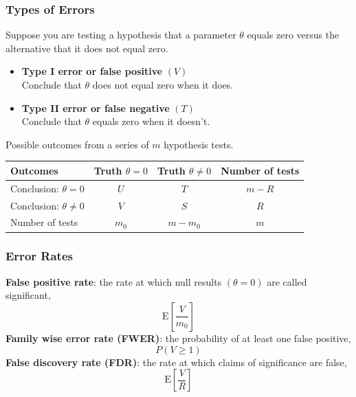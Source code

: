 \documentclass[a4paper]{article}
\begin{document}
\subsubsection{Types of Errors}
Suppose you are testing a hypothesis that a parameter \( \theta \) equals zero versus the alternative that it does not equal zero.
\begin{itemize}
	\item \textbf{Type I error or false positive} \( (V) \)\\
	Conclude that \( \theta \) does not equal zero when it does.
	\item \textbf{Type II error or false negative} \( (T) \)\\
	Conclude that \( \theta \) equals zero when it doesn't.
\end{itemize}
Possible outcomes from a series of \( m \) hypothesis tests.
\begin{table}[H]
	\centering
	\begin{tabular}{@{}lccc@{}}
	\toprule
	Outcomes                        & Truth \( \theta = 0 \) & Truth \( \theta \neq 0 \) & Number of tests \\ \midrule
	Conclusion: \( \theta = 0 \)    & \( U \)                & \( T \)                   & \( m - R \)     \\
	Conclusion: \( \theta \neq 0 \) & \( V \)                & \( S \)                   & \( R \)         \\
	Number of tests                 & \( m_0 \)              & \( m - m_0 \)             & \( m \)         \\ \bottomrule
	\end{tabular}
\end{table}
\subsubsection{Error Rates}
\textcolor{myred}{\textbf{False positive rate}}: the rate at which null results \( (\theta = 0) \) are called significant,
\[
	\mathrm{E} \left[ \frac{V}{m_0} \right]
\]
\textcolor{myred}{\textbf{Family wise error rate (FWER)}}: the probability of at least one false positive,
\[
	P(V \geq 1)
\]
\textcolor{myred}{\textbf{False discovery rate (FDR)}}: the rate at which claims of significance are false,
\[
	\mathrm{E} \left[ \frac{V}{R} \right]
\]
\end{document}
